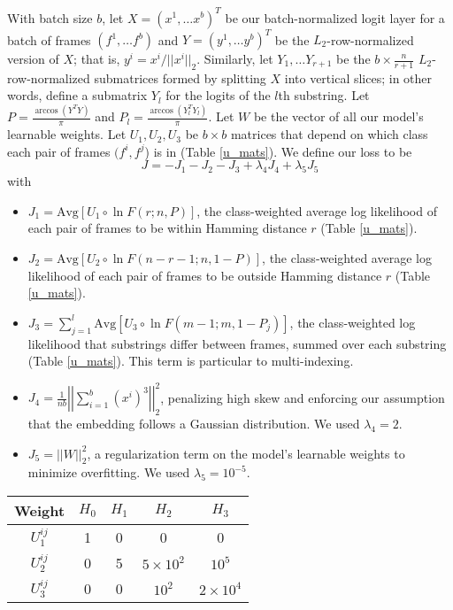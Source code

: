 \documentclass{article}
\renewenvironment{table}{\par\medskip\noindent\minipage{\linewidth}}{\endminipage\par\medskip}
\begin{document}
\begin{multicols}{2}
With batch size $b$, let $X = (x^1, \ldots x^b)^T$ be our batch-normalized logit layer for a batch of frames $(f^1, \ldots f^b)$ and $Y = (y^1, \ldots y^b)^T$ be the $L_2$-row-normalized version of $X$; that is, $y^i = x^i / ||x^i||_2$.
Similarly, let $Y_1, \ldots Y_{r +1}$ be the $b \times \frac{n}{r + 1}$ $L_2$-row-normalized submatrices formed by splitting $X$ into vertical slices; in other words, define a submatrix $Y_l$ for the logits of the $l$th substring.
Let $P = \frac{\arccos\left(Y^TY\right)}{\pi}$ and $P_l = \frac{\arccos\left(Y_l^TY_l\right)}{\pi}$.%
Let $W$ be the vector of all our model's learnable weights.
Let $U_1, U_2, U_3$ be $b\times b$ matrices that depend on which class each pair of frames $(f^i, f^j$) is in (Table \ref{u_mats}).
We define our loss to be
\[J = -J_1 - J_2 - J_3 + \lambda_4J_4 + \lambda_5J_5\]
with
\begin{itemize}
\item $J_1 = \text{Avg}\left[U_1\circ\ln F\left(r; n, P\right)\right]$, the class-weighted average log likelihood of each pair of frames to be within Hamming distance $r$ (Table \ref{u_mats}).
\item $J_2 = \text{Avg}\left[U_2\circ\ln F\left(n - r - 1; n, 1 - P\right)\right]$, the class-weighted average log likelihood of each pair of frames to be outside Hamming distance $r$ (Table \ref{u_mats}). 
\item $J_3 = \sum_{j=1}^l\text{Avg}\left[U_3\circ\ln F\left(m - 1; m, 1 - P_j\right)\right]$, the class-weighted log likelihood that substrings differ between frames, summed over each substring (Table \ref{u_mats}). This term is particular to multi-indexing.
\item $J_4 = \frac{1}{nb}\left|\left|\sum_{i=1}^b(x^i)^3\right|\right|_2^2$, penalizing high skew and enforcing our assumption that the embedding follows a Gaussian distribution. We used $\lambda_4 = 2$.
\item $J_5 = ||W||_2^2$, a regularization term on the model's learnable weights to minimize overfitting. We used $\lambda_5 = 10^{-5}$.
\end{itemize}


\begin{table}
\begin{small}\begin{sc}\begin{center}
\begin{tabular}{ccccc}
\hline
Weight & $H_0$ & $H_1$ & $H_2$ & $H_3$  \\ \hline
$U_1^{ij}$ & 1 & 0 & 0 & 0 \\
$U_2^{ij}$ & 0 & 5 & $5\times10^2$ & $10^5$ \\
$U_3^{ij}$ & 0 & 0 & $10^2$ & $2\times10^4$ \\ \hline
\end{tabular}
\end{center}\end{sc}\end{small}
\label{u_mats}
\end{table}


\end{multicols}
\end{document}

